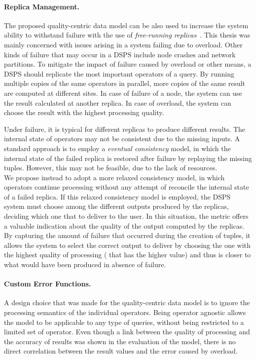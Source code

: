 \paragraph{Replica Management.}
The proposed quality-centric data model can be also used to increase the system ability to withstand
failure with the use of \emph{free-running replicas}~\cite{dependable-is-sensing}. This thesis was mainly
concerned with issues arising in a system failing due to overload. Other kinds of failure that may occur
in a DSPS include node crashes and network partitions. To mitigate the impact of failure caused by
overload or other means, a DSPS should replicate the most important operators of a query. By running
multiple copies of the same operators in parallel, more copies of the same result are computed at
different sites. In case of failure of a node, the system can use the result calculated at another
replica. In case of overload, the system can choose the result with the highest processing quality.

Under failure, it is typical for different replicas to produce different results. The internal state
of operators may not be consistent due to the missing inputs. A standard approach is to employ a
\emph{eventual consistency} model, in which the internal state of the failed replica is restored after
failure by replaying the missing tuples. However, this may not be feasible, due to
the lack of resources.\\
We propose instead to adopt a more relaxed consistency model, in which operators continue processing
without any attempt of reconcile the internal state of a failed replica.
If this relaxed consistency model is employed, the DSPS system must choose among the different outputs
produced by the replicas, deciding which one that to deliver to the user. In this situation, the \sic
metric offers a valuable indication about the quality of the output computed by the replicas. By
capturing the amount of failure that occurred during the creation of tuples, it allows the system to
select the correct output to deliver by choosing the one with the highest quality of processing (\ie
that has the higher \sic value) and thus is closer to what would have been produced in absence of
failure.

\paragraph{Custom Error Functions.}
A design choice that was made for the quality-centric data model is to ignore the processing semantics of
the individual operators. Being operator agnostic allows the model to be applicable to any type of
queries, without being restricted to a limited set of operator. Even though a link between the quality of
processing and the accuracy of results was shown in the evaluation of the model, there is no direct
correlation between the result \sic values and the error caused by overload.

